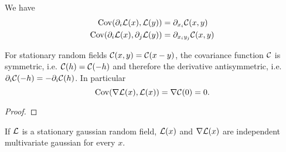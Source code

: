 \begin{lemma}
	\label{lem: covariance of derivative}
	We have
	\begin{align*}
		\operatorname{Cov}(\partial_i\mathcal{L}(x), \mathcal{L}(y)) &= \partial_{x_i} \mathcal{C}(x,y)\\
		\operatorname{Cov}(\partial_i\mathcal{L}(x), \partial_j \mathcal{L}(y)) &= \partial_{x_i y_j} \mathcal{C}(x,y)
	\end{align*}
\end{lemma}
\begin{remark}
	For stationary random fields \(\mathcal{C}(x,y)=\mathcal{C}(x-y)\), the covariance
	function \(\mathcal{C}\) is symmetric, i.e. \(\mathcal{C}(h)=\mathcal{C}(-h)\)
	and therefore the derivative antisymmetric, i.e.
	\(\partial_i\mathcal{C}(-h)=-\partial_i\mathcal{C}(h)\). In particular
	\begin{equation*}
		\operatorname{Cov}(\nabla\mathcal{L}(x), \mathcal{L}(x)) = \nabla \mathcal{C}(0)=0.
	\end{equation*}
\end{remark}
\begin{proof}
	
\end{proof}
\begin{corollary}
	If \(\mathcal{L}\) is a stationary gaussian random field, \(\mathcal{L}(x)\) and
	\(\nabla\mathcal{L}(x)\) are independent multivariate gaussian for every \(x\).
\end{corollary}

